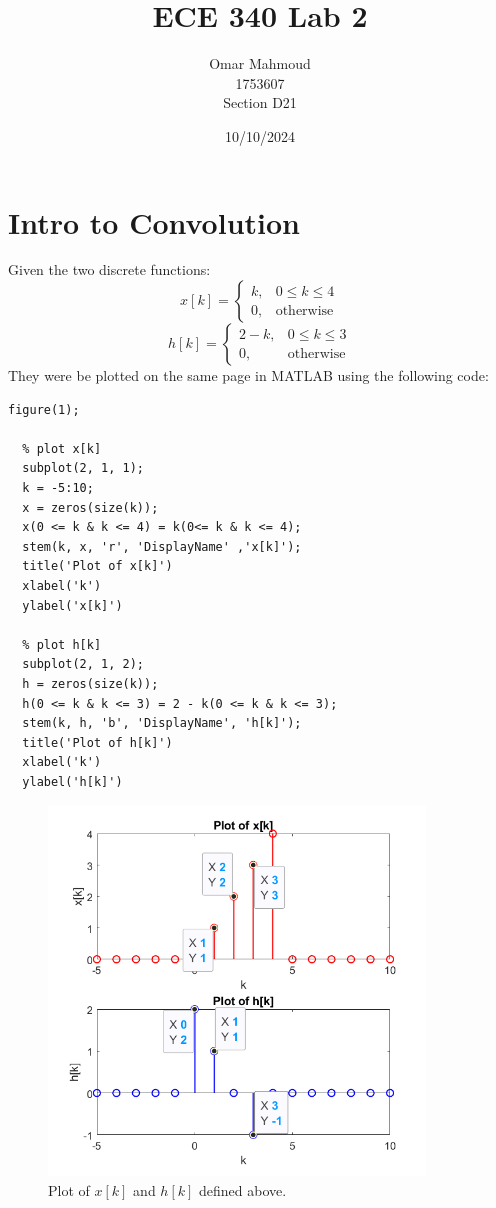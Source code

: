 \documentclass[a4paper, 10pt]{article}
\title{ECE 340 Lab 2}
\author{Omar Mahmoud\\1753607\\Section D21}
\date{10/10/2024}
\begin{document}
\thispagestyle{empty}
\vfill
\maketitle
\vfill

\newpage

\section{Intro to Convolution}
Given the two discrete functions:
\begin{equation}
  x[k] =
  \begin{cases} 
  k, & 0 \leq k \leq 4\\
  0, & \text{otherwise}
  \end{cases}
\end{equation}
\begin{equation}
  h[k] =
  \begin{cases} 
  2-k, & 0 \leq k \leq 3\\
  0, & \text{otherwise}
  \end{cases}
\end{equation}
They were be plotted on the same page in MATLAB using the following code:
\begin{lstlisting}[style=Matlab-editor, basicstyle=\small\ttfamily]
  figure(1);

  % plot x[k]
  subplot(2, 1, 1);
  k = -5:10;
  x = zeros(size(k));
  x(0 <= k & k <= 4) = k(0<= k & k <= 4);
  stem(k, x, 'r', 'DisplayName' ,'x[k]');
  title('Plot of x[k]')
  xlabel('k')
  ylabel('x[k]')
  
  % plot h[k]
  subplot(2, 1, 2);
  h = zeros(size(k));
  h(0 <= k & k <= 3) = 2 - k(0 <= k & k <= 3);
  stem(k, h, 'b', 'DisplayName', 'h[k]');
  title('Plot of h[k]')
  xlabel('k')
  ylabel('h[k]')
\end{lstlisting}
\begin{figure}[H]
  \centering
  \includegraphics[width=10cm]{images/q1_given.png}
  \caption{Plot of $x[k]$ and $h[k]$ defined above.}
\end{figure}
\end{document}
